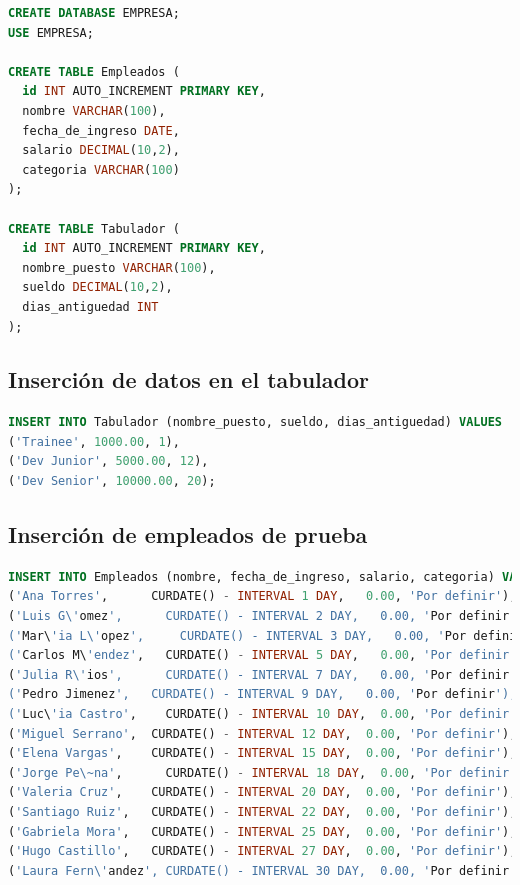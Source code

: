 \documentclass[12pt]{article}
\begin{document}
\begin{lstlisting}[language=SQL]
CREATE DATABASE EMPRESA;
USE EMPRESA;

CREATE TABLE Empleados (
  id INT AUTO_INCREMENT PRIMARY KEY,
  nombre VARCHAR(100),
  fecha_de_ingreso DATE,
  salario DECIMAL(10,2),
  categoria VARCHAR(100)
);

CREATE TABLE Tabulador (
  id INT AUTO_INCREMENT PRIMARY KEY,
  nombre_puesto VARCHAR(100),
  sueldo DECIMAL(10,2),
  dias_antiguedad INT
);
\end{lstlisting}

\subsection*{Inserción de datos en el tabulador}

\begin{lstlisting}[language=SQL]
INSERT INTO Tabulador (nombre_puesto, sueldo, dias_antiguedad) VALUES 
('Trainee', 1000.00, 1),
('Dev Junior', 5000.00, 12),
('Dev Senior', 10000.00, 20);
\end{lstlisting}

\subsection*{Inserción de empleados de prueba}

\begin{lstlisting}[language=SQL]
INSERT INTO Empleados (nombre, fecha_de_ingreso, salario, categoria) VALUES
('Ana Torres',      CURDATE() - INTERVAL 1 DAY,   0.00, 'Por definir'),
('Luis G\'omez',      CURDATE() - INTERVAL 2 DAY,   0.00, 'Por definir'),
('Mar\'ia L\'opez',     CURDATE() - INTERVAL 3 DAY,   0.00, 'Por definir'),
('Carlos M\'endez',   CURDATE() - INTERVAL 5 DAY,   0.00, 'Por definir'),
('Julia R\'ios',      CURDATE() - INTERVAL 7 DAY,   0.00, 'Por definir'),
('Pedro Jimenez',   CURDATE() - INTERVAL 9 DAY,   0.00, 'Por definir'),
('Luc\'ia Castro',    CURDATE() - INTERVAL 10 DAY,  0.00, 'Por definir'),
('Miguel Serrano',  CURDATE() - INTERVAL 12 DAY,  0.00, 'Por definir'),
('Elena Vargas',    CURDATE() - INTERVAL 15 DAY,  0.00, 'Por definir'),
('Jorge Pe\~na',      CURDATE() - INTERVAL 18 DAY,  0.00, 'Por definir'),
('Valeria Cruz',    CURDATE() - INTERVAL 20 DAY,  0.00, 'Por definir'),
('Santiago Ruiz',   CURDATE() - INTERVAL 22 DAY,  0.00, 'Por definir'),
('Gabriela Mora',   CURDATE() - INTERVAL 25 DAY,  0.00, 'Por definir'),
('Hugo Castillo',   CURDATE() - INTERVAL 27 DAY,  0.00, 'Por definir'),
('Laura Fern\'andez', CURDATE() - INTERVAL 30 DAY,  0.00, 'Por definir');
\end{lstlisting}
\end{document}

